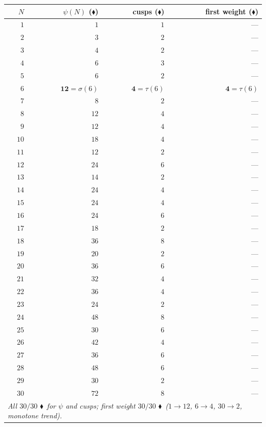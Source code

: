 \documentclass[11pt,a4paper]{article}
\newcommand{\tierF}{\textcolor{blue!60!black}{$\blacklozenge$}}   %
\newcommand{\sig}{\sigma}
\theoremstyle{definition}
\begin{document}
\begin{center}
\begin{longtable}{rrrr}
\toprule
$N$ & $\psi(N)$ (\tierF) & cusps (\tierF) & first weight (\tierF) \\
\midrule
\endhead
$1$  & $1$  & $1$ & --- \\
$2$  & $3$  & $2$ & --- \\
$3$  & $4$  & $2$ & --- \\
$4$  & $6$  & $3$ & --- \\
$5$  & $6$  & $2$ & --- \\
$6$  & $\mathbf{12}=\sig(6)$ & $\mathbf{4}=\tau(6)$ & $\mathbf{4}=\tau(6)$ \\
$7$  & $8$  & $2$ & --- \\
$8$  & $12$ & $4$ & --- \\
$9$  & $12$ & $4$ & --- \\
$10$ & $18$ & $4$ & --- \\
$11$ & $12$ & $2$ & --- \\
$12$ & $24$ & $6$ & --- \\
$13$ & $14$ & $2$ & --- \\
$14$ & $24$ & $4$ & --- \\
$15$ & $24$ & $4$ & --- \\
$16$ & $24$ & $6$ & --- \\
$17$ & $18$ & $2$ & --- \\
$18$ & $36$ & $8$ & --- \\
$19$ & $20$ & $2$ & --- \\
$20$ & $36$ & $6$ & --- \\
$21$ & $32$ & $4$ & --- \\
$22$ & $36$ & $4$ & --- \\
$23$ & $24$ & $2$ & --- \\
$24$ & $48$ & $8$ & --- \\
$25$ & $30$ & $6$ & --- \\
$26$ & $42$ & $4$ & --- \\
$27$ & $36$ & $6$ & --- \\
$28$ & $48$ & $6$ & --- \\
$29$ & $30$ & $2$ & --- \\
$30$ & $72$ & $8$ & --- \\
\midrule
\multicolumn{4}{l}{\emph{All $30/30$ \tierF\ for $\psi$ and cusps; first weight
$30/30$ \tierF\ ($1\!\to\!12$, $6\!\to\!4$, $30\!\to\!2$, monotone trend).}}\\
\bottomrule
\end{longtable}
\end{center}
\end{document}
